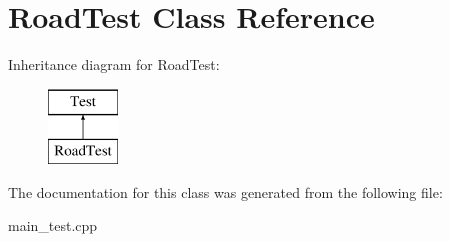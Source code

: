 \hypertarget{class_road_test}{}\section{Road\+Test Class Reference}
\label{class_road_test}
Inheritance diagram for Road\+Test\+:\begin{figure}[H]
\begin{center}
\leavevmode
\includegraphics[height=2.000000cm]{class_road_test}
\end{center}
\end{figure}


The documentation for this class was generated from the following file\+:\begin{DoxyCompactItemize}
\item 
main\+\_\+test.\+cpp\end{DoxyCompactItemize}
